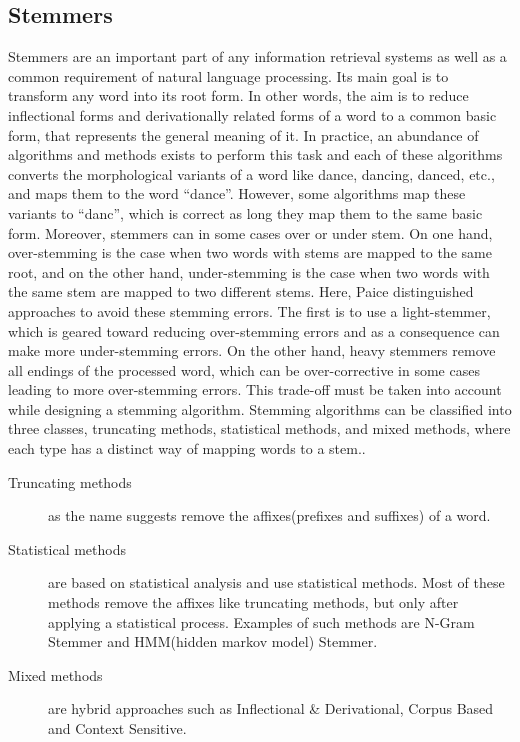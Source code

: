 \subsection{Stemmers}\label{subsec:stemmer}
Stemmers are an important part of any information retrieval systems as well as a common requirement of natural language processing. Its main goal is to transform any word into its root form. In other words, the aim is to reduce inflectional forms and derivationally related forms of a word to a common basic form, that represents the general meaning of it\cite{jivani2011comparative}.\newline
In practice, an abundance of algorithms and methods exists to perform this task and each of these algorithms converts the morphological variants of a word like dance, dancing, danced, etc., and maps them to the word ``dance''. However, some algorithms map these variants to ``danc'', which is correct as long they map them to the same basic form.\cite{jivani2011comparative} Moreover, stemmers can in some cases over or under stem. On one hand, over-stemming is the case when two words with stems are mapped to the same root, and on the other hand, under-stemming is the case when two words with the same stem are mapped to two different stems. Here, Paice distinguished approaches to avoid these stemming errors. The first is to use a light-stemmer, which is geared toward reducing over-stemming errors and as a consequence can make more under-stemming errors. On the other hand, heavy stemmers remove all endings of the processed word, which can be over-corrective in some cases leading to more over-stemming errors. This trade-off must be taken into account while designing a stemming algorithm.\cite{paice1994evaluation}\newline
Stemming algorithms can be classified into three classes, truncating methods, statistical methods, and mixed methods, where each type has a distinct way of mapping words to a stem.\cite{jivani2011comparative}.
\begin{description}
	\item[Truncating methods] as the name suggests remove the affixes(prefixes and suffixes) of a word.
	\item[Statistical methods] are based on statistical analysis and use statistical methods. Most of these methods remove the affixes like truncating methods, but only after applying a statistical process. Examples of such methods are N-Gram Stemmer and HMM(hidden markov model) Stemmer.
	\item[Mixed methods] are hybrid approaches such as Inflectional \& Derivational, Corpus Based and Context Sensitive.
\end{description}
